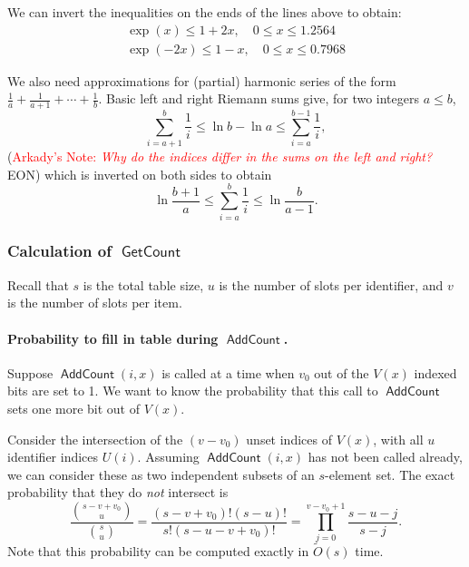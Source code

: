 \documentclass[letterpaper,12pt]{article}
\DeclareMathOperator{\AddCount}{\textsf{AddCount}}
\DeclareMathOperator{\GetCount}{\textsf{GetCount}}
\newcommand{\softO}{\tilde{O}}
\newcommand{\anote}[1]{{\sf (\textcolor{red}{Arkady's Note: {\sl{#1}}} {\sf EON)}}}
\begin{document}
We can invert the inequalities on the ends of the lines above to
obtain:
\begin{eqnarray}
  \exp(x) \le 1 + 2x,\quad
  0 \le x \le 1.2564
  \label{eqn:bound2-exp-pos}
\\[10 pt]
  \exp(-2x) \le 1-x,\quad
  0 \le x \le 0.7968
  \label{eqn:bound2-exp-neg}
\end{eqnarray}

We also need approximations for (partial) harmonic series of the form
\(\frac{1}{a} + \frac{1}{a+1} + \cdots + \frac{1}{b}\). Basic left and
right Riemann sums give, for two integers \(a \le b\),
\[\sum_{i=a+1}^{b} \frac{1}{i} \le \ln b - \ln a \le
\sum_{i=a}^{b-1}\frac{1}{i},\]\anote{Why do the indices differ in the sums on the left and right?}
which is inverted on both sides to obtain
\begin{equation}\label{eq:harm-bound}
\ln\frac{b+1}{a} \le \sum_{i=a}^b \frac{1}{i} \le \ln\frac{b}{a-1}.
\end{equation}

\subsubsection{Calculation of $\GetCount$}

Recall that $s$ is the total table size, $u$ is the number of slots per
identifier, and $v$ is the number of slots per item.

\paragraph{Probability to fill in table during $\AddCount$.}

Suppose $\AddCount(i,x)$ is called at a time when
$v_0$ out of the $V(x)$ indexed bits are set to
1. We want to know the probability that this call to $\AddCount$ sets
one more bit out of $V(x)$.

Consider the intersection of the $(v-v_0)$ unset indices of $V(x)$, with
all $u$ identifier indices $U(i)$. Assuming $\AddCount(i,x)$ has not
been called already, we can consider these as two independent subsets of
an $s$-element set. The exact probability that they do \emph{not}
intersect is
\[\frac{\binom{s-v+v_0}{u}}{\binom{s}{u}}
  = \frac{(s-v+v_0)! (s-u)!}{s! (s-u-v+v_0)!}
  = \prod_{j=0}^{v-v_0+1} \frac{s-u-j}{s-j}.\]
Note that this probability can be computed exactly in $\softO(s)$ time.
\end{document}
